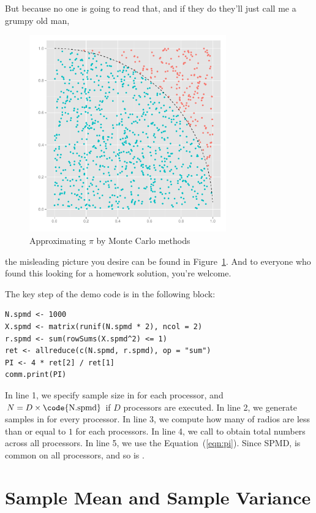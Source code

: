 But because no one is going to read that, and if they do they'll just call me a grumpy old man,
\begin{figure}[h]
\centering
 \includegraphics[height=8.5cm, width=8.5cm]{pbdDEMO-include/pics/misleading}
 \caption{Approximating $\pi$ by Monte Carlo methods}\label{pic:dumb}
\end{figure}
the misleading picture you desire can be found in Figure~\ref{pic:dumb}.  And to everyone who found this looking for a homework solution, you're welcome.

The key step of the demo code is in the following block:
\begin{lstlisting}[language=rr,title=R Code]
N.spmd <- 1000
X.spmd <- matrix(runif(N.spmd * 2), ncol = 2)
r.spmd <- sum(rowSums(X.spmd^2) <= 1)
ret <- allreduce(c(N.spmd, r.spmd), op = "sum")
PI <- 4 * ret[2] / ret[1]
comm.print(PI)
\end{lstlisting}

In line 1, we specify sample size in  for each processor,
and $N=D\times\mbox{\code{N.spmd}}$ if $D$ processors are executed.
In line 2, we generate samples in  for every processor.
In line 3, we compute how many of radios are less than or equal to $1$
for each processors.
In line 4, we call  to obtain total numbers across all
processors.
In line 5, we use the Equation~(\ref{eqn:pi}).
Since SPMD,  is common on all processors, and so is .




\section[Sample Mean and Sample Variance]{Sample Mean and Sample Variance}
\label{sec:sample_stat}

